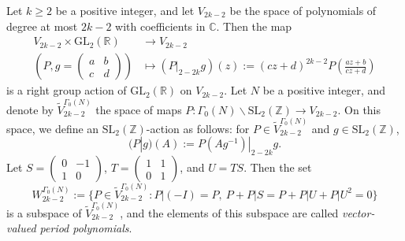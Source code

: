 \documentclass[12pt]{amsart}
\numberwithin{equation}{section}
\theoremstyle{definition}
\begin{document}
Let $k\geq 2$ be a positive integer, and let $V_{2k-2}$ be the space of polynomials of degree at most $2k-2$ with coefficients in $\mathbb{C}$.
Then the map
\begin{align*}
    V_{2k-2}\times\mathrm{GL}_{2}(\mathbb{R})&\rightarrow V_{2k-2}\\
    \left(P,g=\left(\begin{smallmatrix}
        a & b \\ c & d
    \end{smallmatrix}\right)\right)&\mapsto (P|_{2-2k}g)(z):=(cz+d)^{2k-2}P\left(\frac{az+b}{cz+d}\right)
\end{align*}
is a right group action of $\mathrm{GL}_{2}(\mathbb{R})$ on $V_{2k-2}$.
Let $N$ be a positive integer, and denote by $\widetilde{V}_{2k-2}^{\Gamma_{0}(N)}$ the space of maps $P:\Gamma_{0}(N)\backslash\mathrm{SL}_{2}(\mathbb{Z})\rightarrow V_{2k-2}$. 
On this space, we define an $\mathrm{SL}_{2}(\mathbb{Z})$-action as follows: for $P\in\widetilde{V}_{2k-2}^{\Gamma_{0}(N)}$ and $g\in\mathrm{SL}_{2}(\mathbb{Z})$,
$$(P|g)(A):=P(Ag^{-1})|_{2-2k}g.$$
Let $S=\left(\begin{smallmatrix}
    0 & -1 \\ 1 & 0
\end{smallmatrix}\right)$, $T=\left(\begin{smallmatrix}
    1 & 1 \\ 0 & 1
\end{smallmatrix}\right)$, and $U=TS$. 
Then the set
$$W_{2k-2}^{\Gamma_{0}(N)}:=\{P\in \widetilde{V}_{2k-2}^{\Gamma_{0}(N)}:P|(-I)=P,~P+P|S=P+P|U+P|U^{2}=0\}$$
is a subspace of $\widetilde{V}_{2k-2}^{\Gamma_{0}(N)}$, and the elements of this subspace are called \textit{vector-valued period polynomials}.
\end{document}
